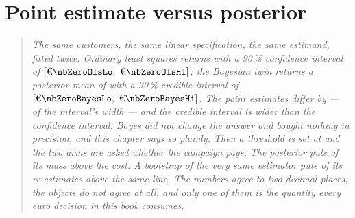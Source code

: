 %
\chapter{Point estimate versus posterior}
\label{ch:pvp}

\begin{quote}\small
\emph{The same \nbZeroNCustomers{} customers, the same linear specification, the same
estimand, fitted twice. Ordinary least squares returns \eur{\nbZeroOlsEst} with a 90\,\%
confidence interval of $[\eur{\nbZeroOlsLo},\ \eur{\nbZeroOlsHi}]$; the Bayesian twin returns
a posterior mean of \eur{\nbZeroBayesMean} with a 90\,\% credible interval of
$[\eur{\nbZeroBayesLo},\ \eur{\nbZeroBayesHi}]$. The point estimates differ by
\eur{\nbZeroEstGap} --- \pc{\nbZeroEstGapPct} of the interval's width --- and the credible
interval is \pc{\nbZeroWidthRatioPct} wider than the confidence interval. Bayes did not
change the answer and bought nothing in precision, and this chapter says so plainly. Then a
threshold is set at \eur{\nbZeroContactCost} and the two arms are asked whether the campaign
pays. The posterior puts \nbZeroPPays{} of its mass above the cost. A bootstrap of the very
same estimator puts \nbZeroBootShare{} of its re-estimates above the same line. The numbers
agree to two decimal places; the objects do not agree at all, and only one of them is the
quantity every euro decision in this book consumes.}
\end{quote}

